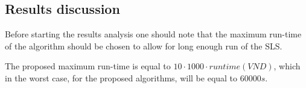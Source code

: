 




\subsection{Results discussion}
Before starting the results analysis one should note that the maximum run-time of the algorithm should be chosen to allow for long enough run of the SLS.
  
The proposed maximum run-time is equal to $10 \cdot 1000 \cdot runtime(VND)$, which in the worst case, for the proposed algorithms, will be equal to $60000s$.
  
